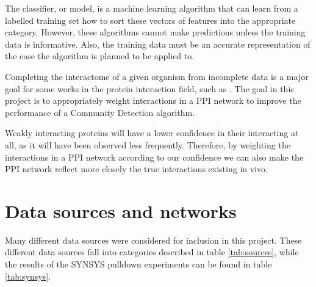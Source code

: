 The classifier, or model, is a machine learning algorithm that can learn from a labelled training set how to sort these vectors of features into the appropriate category. %
However, these algorithms cannot make predictions unless the training data is informative.   
Also, the training data must be an accurate representation of the case the algorithm is planned to be applied to. %

Completing the interactome of a given organism from incomplete data is a major goal for some works in the protein interaction field, such as \textcite{rodgers-melnick_predicting_2013}.
The goal in this project is to appropriately weight interactions in a \ac{PPI} network to improve the performance of a Community Detection algorithm.

Weakly interacting proteins will have a lower confidence in their interacting at all, as it will have been observed less frequently.
Therefore, by weighting the interactions in a \ac{PPI} network according to our confidence we can also make the \ac{PPI} network reflect more closely the true interactions existing in vivo. %

\section{Data sources and networks}
\label{back:sources}

Many different data sources were considered for inclusion in this project. %
These different data sources fall into categories described in table \ref{tab:sources}, while the results of the SYNSYS pulldown experiments can be found in table \ref{tab:synsys}.


